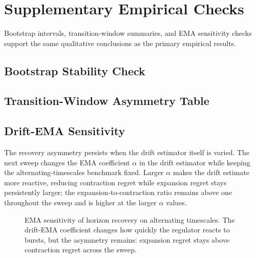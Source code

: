 \section{Supplementary Empirical Checks}\label{app:empirical_support}

Bootstrap intervals, transition-window summaries, and EMA sensitivity checks
support the same qualitative conclusions as the primary empirical results.

\subsection{Bootstrap Stability Check}



\subsection{Transition-Window Asymmetry Table}



\subsection{Drift-EMA Sensitivity}\label{app:ema_sensitivity}

The recovery asymmetry persists when the drift estimator itself is varied. The
next sweep changes the EMA coefficient $\alpha$ in the drift estimator while
keeping the alternating-timescales benchmark fixed. Larger $\alpha$ makes the
drift estimate more reactive, reducing contraction regret while expansion regret
stays persistently larger; the expansion-to-contraction ratio remains above one
throughout the sweep and is higher at the larger $\alpha$ values.

\begin{figure}[!htbp]
\centering
{}
\caption{EMA sensitivity of horizon recovery on alternating timescales. The
drift-EMA coefficient changes how quickly the regulator reacts to bursts, but
the asymmetry remains: expansion regret stays above contraction regret across
the sweep.}
\label{fig:drift_ema_ablation}
\end{figure}
